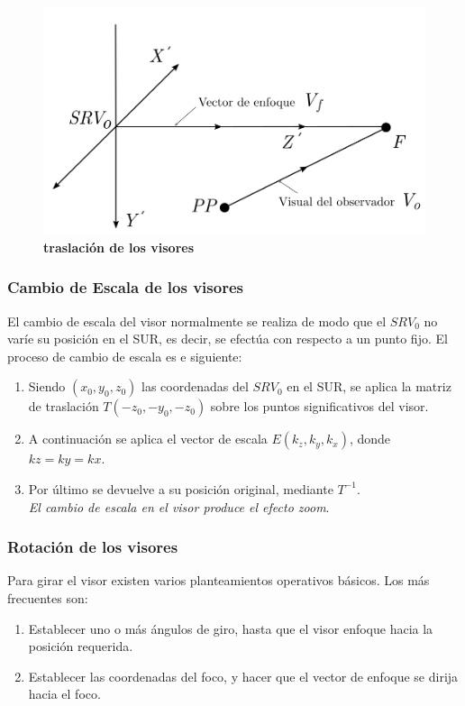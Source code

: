 \begin{figure}[h]
\includegraphics[width=12cm]{Img/GEO/geo-visor-4.png}
\centering
    \caption{\footnotesize{\textbf{traslación de los visores}}}
    \label{geo-visor4}
\end{figure}

\subsubsection{Cambio de Escala de los visores}
El cambio de escala del visor normalmente se realiza de modo que el $SRV_0$ no varíe su posición en el SUR, es decir, se efectúa con respecto a un punto fijo. El proceso de cambio de escala es e siguiente:
\begin{enumerate}
    \item Siendo $(x_0, y_0, z_0)$ las coordenadas del $SRV_0$ en el SUR, se aplica la matriz de traslación $T(-z_0, -y_0, -z_0)$ sobre los puntos significativos del visor.
    \item A continuación se aplica el vector de escala $E(k_z, k_y, k_x)$, donde $kz = ky = kx$.
    \item Por último se devuelve a su posición original, mediante $T^{-1}$. \\
    \textit{El cambio de escala en el visor produce el efecto zoom}.
\end{enumerate}

\subsubsection{Rotación de los visores}
Para girar el visor existen varios planteamientos operativos básicos. Los más frecuentes son:
\begin{enumerate}
\item Establecer uno o más ángulos de giro, hasta que el visor enfoque hacia la posición requerida.
\item Establecer las coordenadas del foco, y hacer que el vector de enfoque se dirija hacia el foco.
\end{enumerate}


